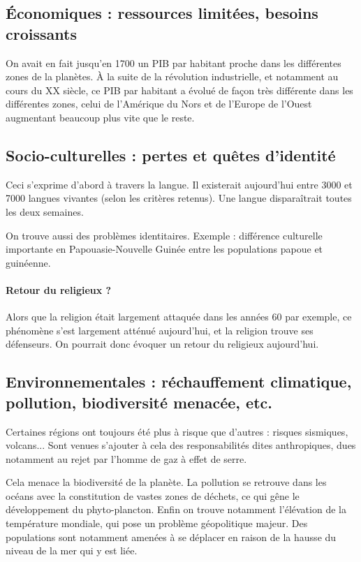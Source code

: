 \documentclass[a4paper,10pt]{article}
\begin{document}
	\subsection{Économiques : ressources limitées, besoins croissants}

		On avait en fait jusqu'en 1700 un PIB par habitant proche dans les différentes zones de la planètes.
		À la suite de la révolution industrielle, et notamment au cours du XX siècle, ce PIB par habitant a évolué de façon très différente dans les différentes zones, celui de l'Amérique du Nors et de l'Europe de l'Ouest augmentant beaucoup plus vite que le reste.

	\subsection{Socio-culturelles : pertes et quêtes d’identité}

		Ceci s’exprime d'abord à travers la langue.
		Il existerait aujourd'hui entre 3000 et 7000 langues vivantes (selon les critères retenus).
		Une langue disparaîtrait toutes les deux semaines.

		On trouve aussi des problèmes identitaires.
		Exemple : différence culturelle importante en Papouasie-Nouvelle Guinée entre les populations papoue et guinéenne.

		\paragraph{Retour du religieux ?}

		Alors que la religion était largement attaquée dans les années 60 par exemple, ce phénomène s'est largement atténué aujourd'hui, et la religion trouve ses défenseurs.
		On pourrait donc évoquer un retour du religieux aujourd'hui.

	\subsection{Environnementales : réchauffement climatique, pollution, biodiversité menacée, etc.}

		Certaines régions ont toujours été plus à risque que d'autres : risques sismiques, volcans...
		Sont venues s'ajouter à cela des responsabilités dites anthropiques, dues notamment au rejet par l'homme de gaz à effet de serre.

		Cela menace la biodiversité de la planète.
		La pollution se retrouve dans les océans avec la constitution de vastes zones de déchets, ce qui gêne le développement du phyto-plancton.
		Enfin on trouve notamment l'élévation de la température mondiale, qui pose un problème géopolitique majeur.
		Des populations sont notamment amenées à se déplacer en raison de la hausse du niveau de la mer qui y est liée.
\end{document}
